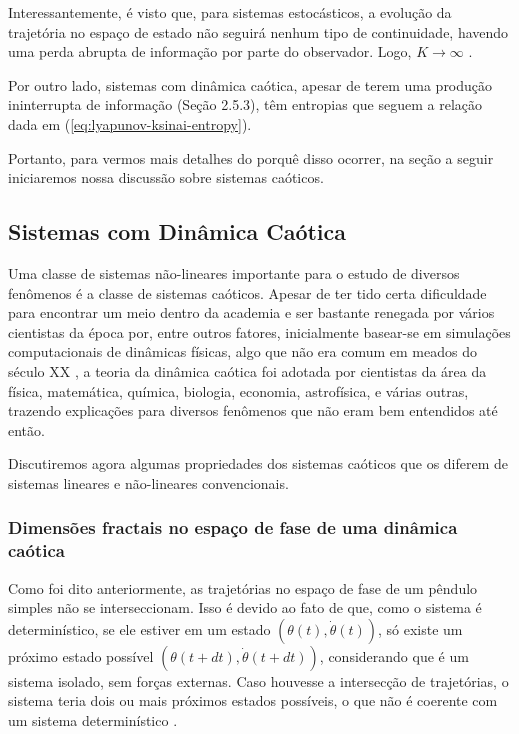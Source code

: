 \documentclass[a4paper, 12pt]{article}
\begin{document}
Interessantemente, é visto que, para sistemas estocásticos, a evolução da trajetória no espaço de estado não seguirá nenhum tipo de continuidade, havendo uma perda abrupta de informação por parte do observador. Logo, $K \rightarrow \infty$ \cite{attux2001dinamica}.

Por outro lado, sistemas com dinâmica caótica, apesar de terem uma produção ininterrupta de informação (Seção 2.5.3), têm entropias que seguem a relação dada em  (\ref{eq:lyapunov-ksinai-entropy}). 

Portanto, para vermos mais detalhes do porquê disso ocorrer, na seção a seguir iniciaremos nossa discussão sobre sistemas caóticos.

\subsection{Sistemas com Dinâmica Caótica}
Uma classe de sistemas não-lineares importante para o estudo de diversos fenômenos é a classe de sistemas caóticos. Apesar de ter tido certa dificuldade para encontrar um meio dentro da academia e ser bastante renegada por vários cientistas da época por, entre outros fatores, inicialmente basear-se em simulações  computacionais de dinâmicas físicas, algo que não era comum em meados do século XX \cite{gleick1998chaos}, a teoria da dinâmica caótica foi adotada por cientistas da área da física, matemática, química, biologia, economia, astrofísica, e várias outras, trazendo explicações para diversos fenômenos que não eram bem entendidos até então.

Discutiremos agora algumas propriedades dos sistemas caóticos que os diferem de sistemas lineares e não-lineares convencionais.

\subsubsection{Dimensões fractais no espaço de fase de uma dinâmica caótica}

Como foi dito anteriormente, as trajetórias no espaço de fase de um pêndulo simples não se interseccionam. Isso é devido ao fato de que, como o sistema é determinístico, se ele estiver em um estado $(\theta(t), \dot{\theta}(t))$, só existe um próximo estado possível $(\theta(t + dt), \dot{\theta}(t + dt))$, considerando que é um sistema isolado, sem forças externas. Caso houvesse a intersecção de trajetórias, o sistema teria dois ou mais próximos estados possíveis, o que não é coerente com um sistema determinístico \cite{fiedler1994caos}.
\end{document}
